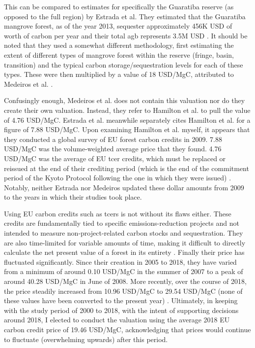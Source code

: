 This can be compared to estimates for specifically the Guaratiba reserve (as opposed to the full region) by Estrada et al. They estimated that the Guaratiba mangrove forest, as of the year 2013, sequester approximately 456K USD of worth of carbon per year and their total \ac{agb} represents 3.5M USD \cite{estradaEconomicEvaluationCarbon2015}. It should be noted that they used a somewhat different methodology, first estimating the extent of different types of mangrove forest within the reserve (fringe, basin, transition) and the typical carbon storage/sequestration levels for each of these types. These were then multiplied by a value of 18 USD/MgC, attributed to Medeiros et al. \cite{medeirosContribuicaoUnidadesConservacao2011}. 

Confusingly enough, Medeiros et al. does not contain this valuation nor do they create their own valuation. Instead, they refer to Hamilton et al. \cite{hamiltonStateForestCarbon2010} to pull the value of 4.76 USD/MgC. Estrada et al. meanwhile separately cites Hamilton et al. for a figure of 7.88 USD/MgC. Upon examining Hamilton et al. myself, it appears that they conducted a global survey of EU forest carbon credits in 2009. 7.88 USD/MgC was the volume-weighted average price that they found. 4.76 USD/MgC was the average of EU \ac{tcer} credits, which must be replaced or reissued at the end of their crediting period (which is the end of the commitment period of the Kyoto Protocol following the one in which they were issued) \cite{salinasNonpermanence2011}. Notably, neither Estrada nor Medeiros updated these dollar amounts from 2009 to the years in which their studies took place. 

Using EU carbon credits such as \acp{tcer} is not without its flaws either. These credits are fundamentally tied to specific emissions-reduction projects and not intended to measure non-project-related carbon stocks and sequestration. They are also time-limited for variable amounts of time, making it difficult to directly calculate the net present value of a forest in its entirety \cite{salinasNonpermanence2011}. Finally their price has fluctuated significantly. Since their creation in 2005 to 2018, they have varied from a minimum of around 0.10 USD/MgC in the summer of 2007 to a peak of around 40.28 USD/MgC in June of 2008. More recently, over the course of 2018, the price steadily increased from 10.96 USD/MgC to 29.54 USD/MgC (none of these values have been converted to the present year) \cite{EUCarbonPermits2023}. Ultimately, in keeping with the study period of 2000 to 2018, with the intent of supporting decisions around 2018, I elected to conduct the valuation using the average 2018 EU carbon credit price of 19.46 USD/MgC, acknowledging that prices would continue to fluctuate (overwhelming upwards) after this period. 

